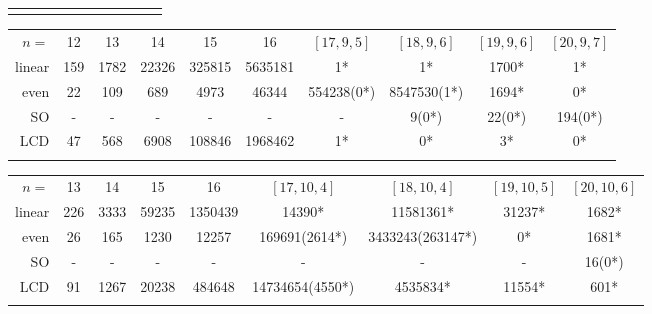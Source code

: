 \documentclass[a4paper,11pt]{article}
\begin{document}
\begin{table}
{\begin{tabular}{r|c|c|c|c|c|c|c|c|c|c}
\noalign{\smallskip}\hline
\end{tabular}
\begin{tabular}{r|c|c|c|c|c|c|c|c|c}
\hline\noalign{\smallskip}
\multicolumn{10}{c}{$k=9$} \\
\hline
$n=$    &   12& 13& 14& 15& 16& $[17,9,5]$& $[18,9,6]$& $[19,9,6]$& $[20,9,7]$\\
\hline
linear  & 	159&	1782&	22326&	325815&	5635181&	1*&	1*&	1700*&	1*\\
even    &  	22&	109&	689&	4973&	46344&	554238(0*)&	8547530(1*)&	1694*&	0*\\
SO      & 	-&	-&	-&	-&	-&	-&	9(0*)&	22(0*)&	194(0*)\\
LCD     & 	47&	568&	6908&	108846&	1968462&	1*&	0*&	3*&	0*\\
\noalign{\smallskip}\hline
\end{tabular}
\begin{tabular}{r|c|c|c|c|c|c|c|c}
\hline\noalign{\smallskip}
\multicolumn{9}{c}{$k=10$} \\
\hline
$n=$    &   13& 14& 15& 16& $[17,10,4]$& $[18,10,4]$& $[19,10,5]$& $[20,10,6]$\\
\hline
linear  & 	226	&3333&	59235&	1350439&	14390*&	11581361*&	31237*&	1682*\\
even    &  	26&	165&	1230&	12257&	169691(2614*)&	3433243(263147*)&	0*&	1681*\\
SO      &  	-	&-&	-&	-&	-&	-&	-&	16(0*)\\
LCD     &  	91&	1267&	20238&	484648&	14734654(4550*)&	4535834*&	11554*&	601*\\
\noalign{\smallskip}\hline
\end{tabular}
}
\end{table}
\end{document}
